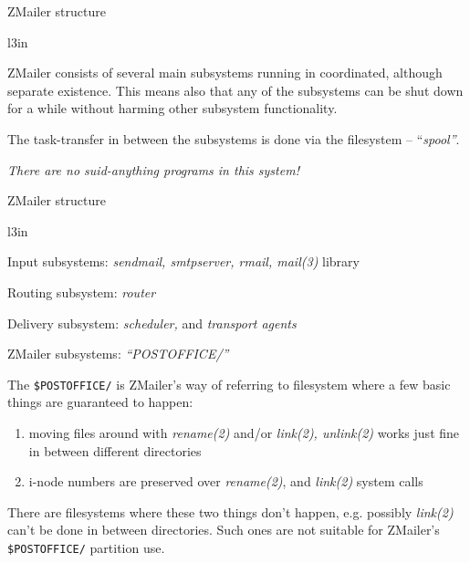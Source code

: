 \documentclass[a4paper,landscape]{slides}
\newcommand{\ZM}{ZMailer}
\begin{document}
\begin{slide}

\centerline{\large \ZM{} structure}

\begin{wrapfigure}{l}{3in}
\mbox{
}
\end{wrapfigure}

\ZM{} consists of several main subsystems running in coordinated,
although separate existence.  This means also that any of the subsystems
can be shut down for a while without harming other subsystem functionality.

The task-transfer in between the subsystems is done via
the filesystem -- {``\it spool''}.

\vfill
\centerline{\it There are no suid-anything programs in this system!}

\vfill

\end{slide}



\begin{slide}

\centerline{\large \ZM{} structure}

\begin{wrapfigure}{l}{3in}
\mbox{
}
\end{wrapfigure}

Input subsystems: {\it sendmail, smtpserver, rmail, mail(3)} library

Routing subsystem: {\it router}

Delivery subsystem: {\it scheduler,} and {\it transport agents}

\vfill

\end{slide}



\begin{slide}

\centerline{\large \ZM{} subsystems: {\it ``POSTOFFICE/''}}

The \verb!$POSTOFFICE/! is \ZM{}'s way of referring to filesystem
where a few basic things are guaranteed to happen:
\begin{enumerate}
\item moving files around with {\it rename(2)} and/or {\it link(2), unlink(2)}
      works just fine in between different directories
\item i-node numbers are preserved over {\it rename(2)}, and {\it link(2)}
	system calls
\end{enumerate}

There are filesystems where these two things don't happen, e.g. possibly
{\it link(2)} can't be done in between directories.  Such ones are not
suitable for \ZM's \verb!$POSTOFFICE/! partition use.
\vfill

\end{slide}
\end{document}
